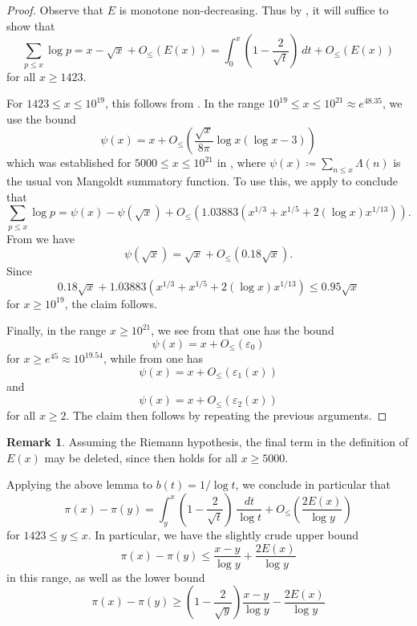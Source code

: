 \documentclass[12pt,a4paper,reqno]{amsart}
\numberwithin{equation}{section}
\theoremstyle{plain}
\theoremstyle{definition}
\newtheorem{remark}[theorem]{Remark}
\newcommand\eps{\varepsilon}
\begin{document}
\begin{proof} Observe that $E$ is monotone non-decreasing. Thus by , it will suffice to show that
$$ \sum_{p \leq x} \log p = x - \sqrt{x} + O_{\leq}(E(x))
  = \int_0^x \left(1-\frac{2}{\sqrt{t}}\right)\ dt + O_{\leq}(E(x))$$
for all $x \geq 1423$.

For $1423 \leq x \leq 10^{19}$, this follows from \cite[Theorem 2]{buthe-2}.  In the range
 $10^{19} \leq x \leq 10^{21} \approx e^{48.35}$, we use the bound
  $$ \psi(x) = x + O_{\leq}\left(\frac{\sqrt{x}}{8\pi} \log x(\log x - 3)\right)
$$
which was established for $5000 \leq x \leq 10^{21}$ in \cite[(7.3)]{buthe}, where $\psi(x) \coloneqq \sum_{n \leq x} \Lambda(n)$ is the usual von Mangoldt summatory function.  To use this, we apply \cite[(6.10), (6.11)]{buthe} to conclude that
$$
\sum_{p \leq x} \log p = \psi(x) - \psi(\sqrt{x}) + O_{\leq}(1.03883 (x^{1/3} + x^{1/5} + 2 (\log x) x^{1/13})).$$
From \cite[Theorems 10,12]{rs} we have
$$ \psi(\sqrt{x}) = \sqrt{x} + O_{\leq}(0.18 \sqrt{x}).$$
Since
$$ 0.18 \sqrt{x} + 1.03883 (x^{1/3} + x^{1/5} + 2 (\log x) x^{1/13}) \leq 0.95 \sqrt{x}$$
for $x \geq 10^{19}$, the claim follows.

Finally, in the range $x \geq 10^{21}$, we see from \cite[Theorem 1, Table 1]{buthe} that one has the bound
$$ \psi(x) = x + O_{\leq}(\eps_0)$$
for $x \geq e^{45} \approx 10^{19.54}$, while from \cite[Theorems 1.1, 1.4]{johnston-yang} one has
$$ \psi(x) = x + O_{\leq}(\eps_1(x))$$
and
$$ \psi(x) = x + O_{\leq}(\eps_2(x))$$
for all $x \geq 2$.  The claim then follows by repeating the previous arguments.
\end{proof}
    
\begin{remark} Assuming the Riemann hypothesis, the final term in the definition of $E(x)$ may be deleted, since \cite[(7.3)]{buthe} then holds for all $x \geq 5000$.  
\end{remark}

Applying the above lemma to $b(t) = 1/\log t$, we conclude in particular that
\begin{equation}\label{pi-est} \pi(x) - \pi(y) = \int_y^x \left(1 - \frac{2}{\sqrt{t}}\right) \ \frac{dt}{\log t}
+ O_\leq\left(\frac{2 E(x)}{\log y}\right)
\end{equation}
for $1423 \leq y \leq x$. In particular, we have the slightly crude upper bound
\begin{equation}\label{pixy-upper} \pi(x) - \pi(y) \leq \frac{x-y}{\log y} + \frac{2 E(x)}{\log y}
\end{equation}
in this range, as well as the lower bound
\begin{equation}\label{pixy-lower} \pi(x) - \pi(y) \geq \left(1-\frac{2}{\sqrt{y}}\right)\frac{x-y}{\log y} - \frac{2 E(x)}{\log y}
\end{equation}
\end{document}
